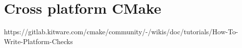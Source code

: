 \documentclass[../LabBook]{subfiles}
\begin{document}
    \section{Cross platform CMake}
    https://gitlab.kitware.com/cmake/community/-/wikis/doc/tutorials/How-To-Write-Platform-Checks
\end{document}
